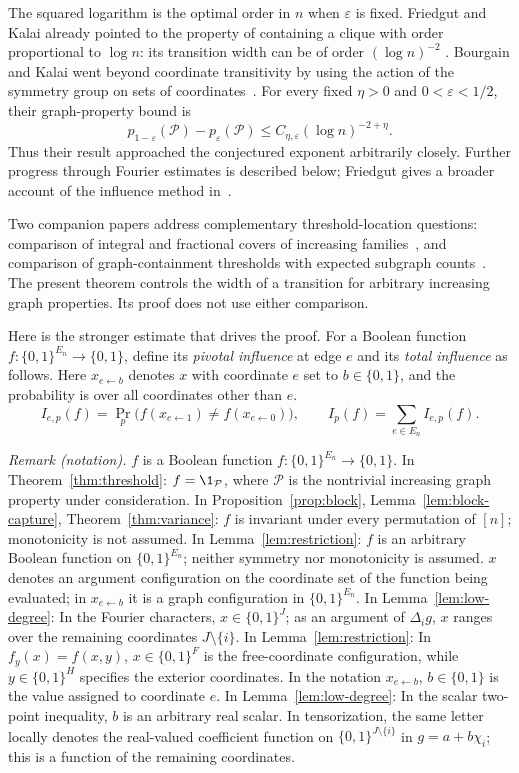 The squared logarithm is the optimal order in $n$ when
$\varepsilon$ is fixed. Friedgut and Kalai already pointed to the
property of containing a clique with order proportional to $\log n$:
its transition width can be of order $(\log n)^{-2}$
\cite[p.~2994]{FK96}.
Bourgain and Kalai went beyond coordinate transitivity by using the
action of the symmetry group on sets of coordinates~\cite{BK97}.
For every fixed $\eta>0$ and $0<\varepsilon<1/2$, their graph-property
bound is
\[
 p_{1-\varepsilon}(\mathcal P)-p_\varepsilon(\mathcal P)
 \le C_{\eta,\varepsilon}(\log n)^{-2+\eta}.
\]
Thus their result approached the conjectured exponent arbitrarily
closely. Further progress through Fourier estimates is described below;
Friedgut gives a broader account of the influence method
in~\cite{Friedgut22}.

Two companion papers address complementary threshold-location
questions: comparison of integral and fractional covers of increasing
families~\cite[Theorem~1.1]{ExpectationEquivalence2026}, and comparison
of graph-containment thresholds with expected subgraph
counts~\cite[Theorem~1.1]{SecondKahnKalai2026}.
The present theorem controls the width of a transition for arbitrary
increasing graph properties. Its proof does not use either comparison.

Here is the stronger estimate that drives the proof. For a Boolean function $f:\{0,1\}^{E_n}\to\{0,1\}$, define its \emph{pivotal influence} at edge $e$ and its \emph{total influence} as follows. Here $x_{e\leftarrow b}$ denotes $x$ with coordinate $e$ set to $b\in\{0,1\}$, and the probability is over all coordinates other than $e$.
\[
 I_{e,p}(f)=\Pr_p\bigl(f(x_{e\leftarrow1})\ne f(x_{e\leftarrow0})\bigr),
 \qquad I_p(f)=\sum_{e\in E_n}I_{e,p}(f).
\]

\noindent\textit{Remark (notation).} $f$ is a Boolean function $f:\{0,1\}^{E_n}\to\{0,1\}$. In Theorem~\ref{thm:threshold}: $f=\1_{\mathcal P}$, where $\mathcal P$ is the nontrivial increasing graph property under consideration. In Proposition~\ref{prop:block}, Lemma~\ref{lem:block-capture}, Theorem~\ref{thm:variance}: $f$ is invariant under every permutation of $[n]$; monotonicity is not assumed. In Lemma~\ref{lem:restriction}: $f$ is an arbitrary Boolean function on $\{0,1\}^{E_n}$; neither symmetry nor monotonicity is assumed. $x$ denotes an argument configuration on the coordinate set of the function being evaluated; in $x_{e\leftarrow b}$ it is a graph configuration in $\{0,1\}^{E_n}$. In Lemma~\ref{lem:low-degree}: In the Fourier characters, $x\in\{0,1\}^{J}$; as an argument of $\Delta_i g$, $x$ ranges over the remaining coordinates $J\setminus\{i\}$. In Lemma~\ref{lem:restriction}: In $f_y(x)=f(x,y)$, $x\in\{0,1\}^{F}$ is the free-coordinate configuration, while $y\in\{0,1\}^{H}$ specifies the exterior coordinates. In the notation $x_{e\leftarrow b}$, $b\in\{0,1\}$ is the value assigned to coordinate $e$. In Lemma~\ref{lem:low-degree}: In the scalar two-point inequality, $b$ is an arbitrary real scalar. In tensorization, the same letter locally denotes the real-valued coefficient function on $\{0,1\}^{J\setminus\{i\}}$ in $g=a+b\chi_i$; this is a function of the remaining coordinates.


